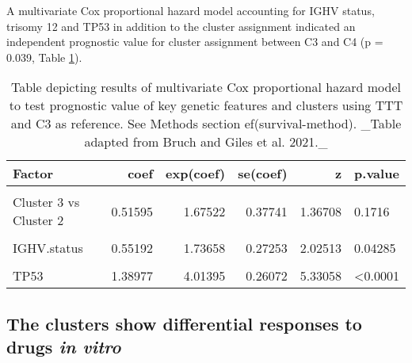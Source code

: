 \documentclass[11pt, a4paper, twosided]{book}
\begin{document}
A multivariate Cox proportional hazard model accounting for IGHV status, trisomy 12 and TP53 in addition to the cluster assignment indicated an independent prognostic value for cluster assignment between C3 and C4 (p = 0.039, Table \ref{tab:clusterCox}).
\begin{table}

\caption{\label{tab:clusterCox}Table depicting results of multivariate Cox proportional hazard model to test prognostic value of key genetic features and clusters using TTT and C3 as reference. See Methods section ef(survival-method). _Table adapted from Bruch and Giles et al. 2021._}
\centering
\fontsize{7}{9}\selectfont
\begin{tabular}[t]{l|r|r|r|r|l}
\hline
Factor & coef & exp(coef) & se(coef) & z & p.value\\
\hline
\cellcolor[HTML]{E2E868}{Cluster 3 vs Cluster 1} & \cellcolor[HTML]{E2E868}{-0.03979} & \cellcolor[HTML]{E2E868}{0.96099} & \cellcolor[HTML]{E2E868}{0.29813} & \cellcolor[HTML]{E2E868}{-0.13347} & \cellcolor[HTML]{E2E868}{0.89382}\\
\hline
Cluster 3 vs Cluster 2 & 0.51595 & 1.67522 & 0.37741 & 1.36708 & 0.1716\\
\hline
\cellcolor[HTML]{E2E868}{Cluster 3 vs Cluster 4} & \cellcolor[HTML]{E2E868}{-0.82011} & \cellcolor[HTML]{E2E868}{0.44038} & \cellcolor[HTML]{E2E868}{0.39760} & \cellcolor[HTML]{E2E868}{-2.06267} & \cellcolor[HTML]{E2E868}{0.03914}\\
\hline
IGHV.status & 0.55192 & 1.73658 & 0.27253 & 2.02513 & 0.04285\\
\hline
\cellcolor[HTML]{E2E868}{trisomy 12} & \cellcolor[HTML]{E2E868}{-0.13357} & \cellcolor[HTML]{E2E868}{0.87496} & \cellcolor[HTML]{E2E868}{0.35617} & \cellcolor[HTML]{E2E868}{-0.37503} & \cellcolor[HTML]{E2E868}{0.70764}\\
\hline
TP53 & 1.38977 & 4.01395 & 0.26072 & 5.33058 & <0.0001\\
\hline
\end{tabular}
\end{table}
\hypertarget{the-clusters-show-differential-responses-to-drugs-in-vitro}{%
\subsection{\texorpdfstring{The clusters show differential responses to drugs \emph{in vitro}}{The clusters show differential responses to drugs in vitro}}\label{the-clusters-show-differential-responses-to-drugs-in-vitro}}
\end{document}

